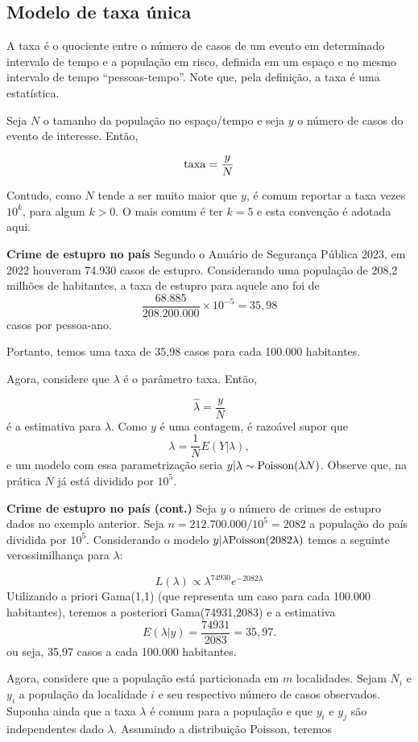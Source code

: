 \documentclass[
  letterpaper,
  DIV=11,
  numbers=noendperiod]{scrreprt}
\theoremstyle{definition}
\theoremstyle{plain}
\theoremstyle{definition}
\theoremstyle{remark}
\begin{document}
\subsection{Modelo de taxa única}\label{modelo-de-taxa-uxfanica-1}

A taxa é o quociente entre o número de casos de um evento em determinado
intervalo de tempo e a população em risco, definida em um espaço e no
mesmo intervalo de tempo ``pessoas-tempo''. Note que, pela definição, a
taxa é uma estatística.

Seja \(N\) o tamanho da população no espaço/tempo e seja \(y\) o número
de casos do evento de interesse. Então,

\[\hbox{taxa} = \frac{y}{N}\]

Contudo, como \(N\) tende a ser muito maior que \(y\), é comum reportar
a taxa vezes \(10^k\), para algum \(k>0\). O mais comum é ter \(k=5\) e
esta convenção é adotada aqui.

\label{exm}
\textbf{Crime de estupro no país} Segundo o Anuário de Segurança Pública
2023, em 2022 houveram 74.930 casos de estupro. Considerando uma
população de 208,2 milhões de habitantes, a taxa de estupro para aquele
ano foi de \[\frac{68.885}{208.200.000}\times 10^{-5}=35,98\] casos por
pessoa-ano.

Portanto, temos uma taxa de 35,98 casos para cada 100.000 habitantes.

Agora, considere que \(\lambda\) é o parâmetro taxa. Então,

\[\hat{\lambda}=\frac{y}{N}\] é a estimativa para \(\lambda\). Como
\(y\) é uma contagem, é razoável supor que
\[\lambda =\frac{1}{N}E(Y|\lambda),\] e um modelo com essa
parametrização seria \(y|\lambda\sim\hbox{Poisson}(\lambda N)\). Observe
que, na prática \(N\) já está dividido por \(10^5\).

\label{exm}
\textbf{Crime de estupro no país (cont.)} Seja \(y\) o número de crimes
de estupro dados no exemplo anterior. Seja \(n=212.700.000/10^5=2082\) a
população do país dividida por \(10^5\). Considerando o modelo
\(y|\lambda\hbox{Poisson}(2082\lambda)\) temos a seguinte
verossimilhança para \(\lambda\):

\[L(\lambda)\propto \lambda^{74930}e^{-2082\lambda  }\] Utilizando a
priori Gama(1,1) (que representa um caso para cada 100.000 habitantes),
teremos a posteriori Gama(74931,2083) e a estimativa
\[E(\lambda|y)=\frac{74931}{2083}=35,97.\] ou seja, 35,97 casos a cada
100.000 habitantes.

Agora, considere que a população está particionada em \(m\) localidades.
Sejam \(N_i\) e \(y_i\) a população da localidade \(i\) e seu respectivo
número de casos observados. Suponha ainda que a taxa \(\lambda\) é comum
para a população e que \(y_i\) e \(y_j\) são independentes dado
\(\lambda\). Assumindo a distribuição Poisson, teremos
\end{document}
